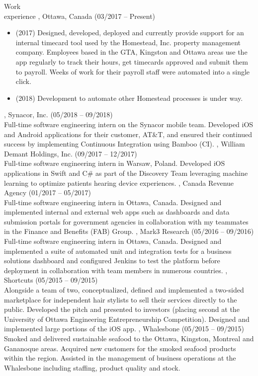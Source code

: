 \documentclass{resume}
\begin{document}
\begin{category}{Work \\experience}
, Ottawa, Canada (03/2017 -- Present)
\begin{itemize}
  \item (2017) Designed, developed, deployed and currently provide support for an
    internal timecard tool used by the Homestead, Inc. property management company.
    Employees based in the GTA, Kingston and Ottawa areas use the app regularly to
    track their hours, get timecards approved and submit them to payroll.
    Weeks of work for their payroll staff were automated into a single click.
  \item (2018) Development to automate other Homestead processes is under way.
  \end{itemize}
, Synacor, Inc. (05/2018 -- 09/2018)\\
Full-time software engineering intern on the Synacor mobile team.
Developed iOS and Android applications for their customer, AT\&T, and ensured
their continued success by implementing Continuous Integration using Bamboo (CI).
, William Demant Holdings, Inc. (09/2017 -- 12/2017)\\
Full-time software engineering intern in Warsaw, Poland.
Developed iOS applications in Swift and C\# as part of the Discovery Team leveraging machine
learning to optimize patients hearing device experiences.
, Canada Revenue Agency (01/2017 -- 05/2017)\\
Full-time software engineering intern in Ottawa, Canada. Designed and implemented internal
and external web apps such as dashboards and data submission portals for government agencies
in collaboration with my teammates in the Finance and Benefits (FAB) Group.
, Mark3 Research (05/2016 -- 09/2016)\\
Full-time software engineering intern in Ottawa, Canada. Designed and implemented a suite
of automated unit and integration tests for a business solutions dashboard and configured
Jenkins to test the platform before deployment in collaboration with team members in
numerous countries.
, Shortcuts (05/2015 -- 09/2015)\\
Alongside a team of two, conceptualized, defined and implemented a two-sided marketplace for
independent hair stylists to sell their services directly to the public. Developed
the pitch and presented to investors (placing second at the University of
Ottawa Engineering Entrepreneurship Competition). 
Designed and implemented large portions of the iOS app.
, Whalesbone (05/2015 -- 09/2015)\\
Smoked and delivered sustainable seafood to the Ottawa, Kingston, Montreal
and Gananoque areas. Acquired new customers for the smoked seafood products within the region.
Assisted in the management of business operations at the Whalesbone including staffing,
product quality and stock.
\end{category}
\end{document}
